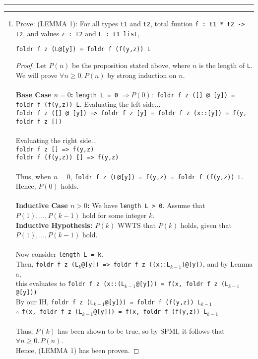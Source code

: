\documentclass[11pt]{article}
\newcommand{\question}[2] {\vspace{.25in} \hrule\vspace{0.5em}
\noindent{\bf #1: #2} \vspace{0.5em}
\hrule \vspace{.10in}}
\begin{document}
\question{3}{High Order Warp Jump}
\begin{enumerate}
\item Prove: (LEMMA 1): For all types \verb|t1| and \verb|t2|, total funtion \verb|f : t1 * t2 -> t2|, and values \verb|z : t2| and \verb|L : t1 list|,
\begin{center} \verb|foldr f z (L@[y]) = foldr f (f(y,z)) L|\end{center}
\begin{proof}
Let $P(n)$ be the proposition stated above, where $n$ is the length of \verb|L|.  We will prove $\forall n \geq 0.\, P(n)$ by strong induction on $n$.\\\\
\textbf{Base Case $n = 0$:} \verb|length L = 0| $\Rightarrow P(0):$ \verb|foldr f z ([] @ [y]) = foldr f (f(y,z)) L|.  Evaluating the left side...\\
\verb|foldr f z ([] @ [y]) => foldr f z [y] = foldr f z (x::[y]) = f(y, foldr f z [])|\\\\
Evaluating the right side...\\
\verb|foldr f z [] => f(y,z)|\\
\verb|foldr f (f(y,z)) [] => f(y,z)|\\\\
Thus, when $n = 0$, \verb|foldr f z (L@[y]) = f(y,z) = foldr f (f(y,z)) L|.\\
Hence, $P(0)$ holds.\\\\
\textbf{Inductive Case $n > 0$:} We have \verb|length L > 0|.  Assume that $P(1),...,P(k-1)$ hold for some integer $k$.\\
\textbf{Inductive Hypothesis: $P(k)$} WWTS that $P(k)$ holds, given that $P(1),...,P(k-1)$ hold.\\\\
Now consider \verb|length L = k|.\\
Then, \verb|foldr f z (L|$_k$\verb|@[y]) => foldr f z ((x::L|$_{k-1}$\verb|)@[y])|, and by Lemma a,\\ this evaluates to \verb|foldr f z (x::(L|$_{k-1}$\verb|@[y])) = f(x, foldr f z (L|$_{k-1}$\verb|@[y]))|\\
By our IH, \verb|foldr f z (L|$_{k-1}$\verb|@[y])) = foldr f (f(y,z)) L|$_{k-1}$\\
$\therefore$ \verb|f(x, foldr f z (L|$_{k-1}$\verb|@[y])) = f(x, foldr f (f(y,z)) L|$_{k-1}$\\\\
Thus, $P(k)$ has been shown to be true, so by SPMI, it follows that $\forall n \geq 0.\, P(n)$.\\
Hence, (LEMMA 1) has been proven.
\end{proof}


\end{enumerate}
\end{document}
